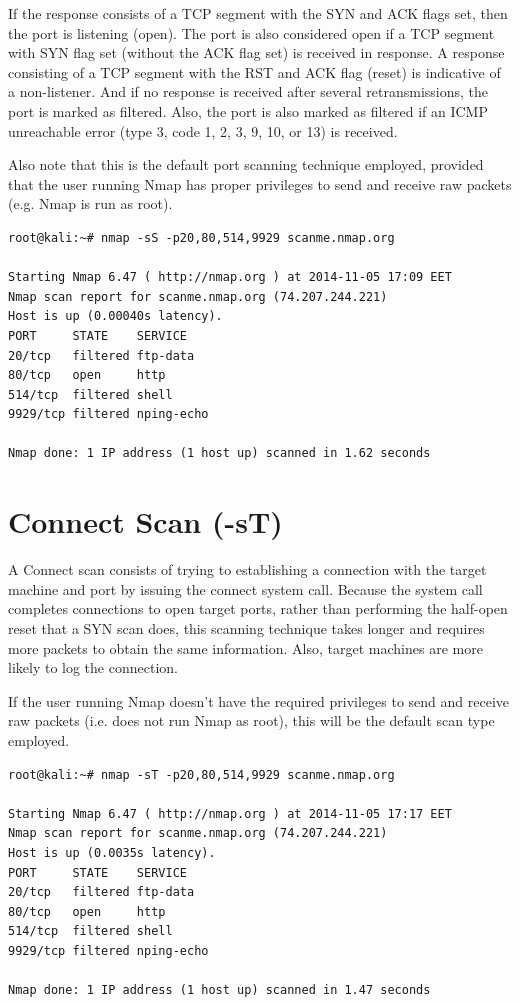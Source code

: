\documentclass[a4paper,oneside,12pt]{book}
\begin{document}
If the response consists of a TCP segment with the SYN and ACK flags set, then the port is listening (open). The port is also considered open if a TCP segment with SYN flag set (without the ACK flag set) is received in response. A response consisting of a TCP segment with the RST and ACK flag (reset) is indicative of a non-listener. And if no response is received after several retransmissions, the port is marked as filtered. Also, the port is also marked as filtered if an ICMP unreachable error (type 3, code 1, 2, 3, 9, 10, or 13) is received.

Also note that this is the default port scanning technique employed, provided that the user running Nmap has proper privileges to send and receive raw packets (e.g. Nmap is run as root).

\begin{lstlisting}[title=A sample Nmap scan using the SYN Scan option]
root@kali:~# nmap -sS -p20,80,514,9929 scanme.nmap.org

Starting Nmap 6.47 ( http://nmap.org ) at 2014-11-05 17:09 EET
Nmap scan report for scanme.nmap.org (74.207.244.221)
Host is up (0.00040s latency).
PORT     STATE    SERVICE
20/tcp   filtered ftp-data
80/tcp   open     http
514/tcp  filtered shell
9929/tcp filtered nping-echo

Nmap done: 1 IP address (1 host up) scanned in 1.62 seconds
\end{lstlisting}


\section{Connect Scan (-sT)}

A Connect scan consists of trying to establishing a connection with the target machine and port by issuing the connect system call. Because the system call completes connections to open target ports, rather than performing the half-open reset that a SYN scan does, this scanning technique takes longer and requires more packets to obtain the same information. Also, target machines are more likely to log the connection.

If the user running Nmap doesn't have the required privileges to send and receive raw packets (i.e. does not run Nmap as root), this will be the default scan type employed.

\begin{lstlisting}[title=A sample Nmap scan using the Connect Scan option]
root@kali:~# nmap -sT -p20,80,514,9929 scanme.nmap.org

Starting Nmap 6.47 ( http://nmap.org ) at 2014-11-05 17:17 EET
Nmap scan report for scanme.nmap.org (74.207.244.221)
Host is up (0.0035s latency).
PORT     STATE    SERVICE
20/tcp   filtered ftp-data
80/tcp   open     http
514/tcp  filtered shell
9929/tcp filtered nping-echo

Nmap done: 1 IP address (1 host up) scanned in 1.47 seconds
\end{lstlisting}
\end{document}
